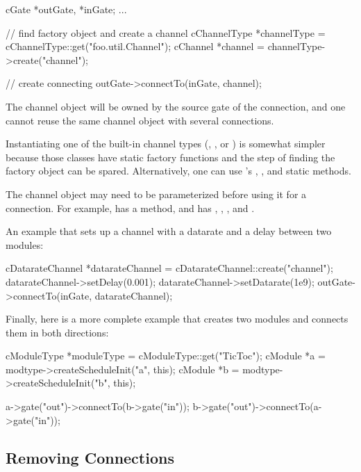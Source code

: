 \begin{cpp}
cGate *outGate, *inGate;
...

// find factory object and create a channel
cChannelType *channelType = cChannelType::get("foo.util.Channel");
cChannel *channel = channelType->create("channel");

// create connecting
outGate->connectTo(inGate, channel);
\end{cpp}

The channel object will be owned by the source gate of the connection, and
one cannot reuse the same channel object with several connections.

Instantiating one of the built-in channel types (,
, or ) is somewhat simpler
because those classes have static  factory functions and the
step of finding the factory object can be spared. Alternatively, one can use
's , ,
and  static methods.

The channel object may need to be parameterized before using it for a
connection. For example,  has a 
method, and  has ,
, , and
.

An example that sets up a channel with a datarate and a delay between two
modules:

\begin{cpp}
cDatarateChannel *datarateChannel = cDatarateChannel::create("channel");
datarateChannel->setDelay(0.001);
datarateChannel->setDatarate(1e9);
outGate->connectTo(inGate, datarateChannel);
\end{cpp}

Finally, here is a more complete example that creates two modules and
connects them in both directions:

\begin{cpp}
cModuleType *moduleType = cModuleType::get("TicToc");
cModule *a = modtype->createScheduleInit("a", this);
cModule *b = modtype->createScheduleInit("b", this);

a->gate("out")->connectTo(b->gate("in"));
b->gate("out")->connectTo(a->gate("in"));
\end{cpp}


\subsection{Removing Connections}
\label{sec:simple-modules:removing-connections}


